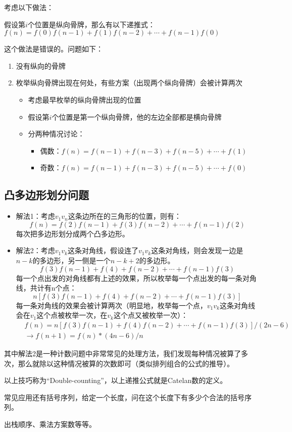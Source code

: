 \documentclass{article}
\begin{document}
考虑以下做法：

假设第$i$个位置是纵向骨牌，那么有以下递推式：
$f(n)=f(0)f(n-1)+f(1)f(n-2)+\cdots+f(n-1)f(0)$

这个做法是错误的。问题如下：
\begin{enumerate}
  \item{没有纵向的骨牌}
  \item{枚举纵向骨牌出现在何处，有些方案（出现两个纵向骨牌）会被计算两次}
  \begin{itemize}
    \item{考虑最早枚举的纵向骨牌出现的位置}
    \item{假设第$i$个位置是第一个纵向骨牌，他的左边全部都是横向骨牌}
    \item{分两种情况讨论：}
    \begin{itemize}
      \item{偶数：$f(n)=f(n-1)+f(n-3)+f(n-5)+\cdots+f(1)$}
      \item{奇数：$f(n)=f(n-1)+f(n-3)+f(n-5)+\cdots+f(0)$}
    \end{itemize}
  \end{itemize}
\end{enumerate}
\subsection{凸多边形划分问题}
\begin{itemize}
    \item{解法1：考虑$v_1v_n$这条边所在的三角形的位置，则有：
    \begin{equation*}
      f(n)=f(2)f(n-1)+f(3)f(n-2)+\cdots+f(n-1)f(2)
    \end{equation*}
    每次把多边形划分成两个凸多边形。}
    \item{解法2：考虑$v_1v_k$这条对角线，假设连了$v_1v_k$这条对角线，则会发现一边是$n-k$的多边形，另一侧是一个$n-k+2$的多边形。
    \begin{equation*}
      f(3)f(n-1)+f(4)+f(n-2)+\cdots+f(n-1)f(3)
    \end{equation*}
    每一个点出发的对角线都有上述的效果，所以枚举每一个点出发的每一条对角线，共计有n个点：
    \begin{equation*}
      n[f(3)f(n-1)+f(4)+f(n-2)+\cdots+f(n-1)f(3)]
    \end{equation*}
    每一条对角线的效果会被计算两次（明显地，枚举每一个点，$v_1v_k$这条对角线会在$v_1$这个点被枚举一次，在$v_k$这个点又被枚举一次）：
    \begin{equation*}
      \begin{aligned}
    &f(n)=n[f(3)f(n-1)+f(4)f(n-2)+\cdots+f(n-1)f(3)]/(2n-6)\\
    &\to f(n+1)=f(n)*(4n-6)/n
      \end{aligned}
    \end{equation*}
    }
\end{itemize}
其中解法2是一种计数问题中非常常见的处理方法，我们发现每种情况被算了多次，那么就除以这种情况被算的次数即可（类似排列组合的公式的推导）。

以上技巧称为``Double-counting''，以上递推公式就是Catelan数的定义。

常见应用还有括号序列，给定一个长度，问在这个长度下有多少个合法的括号序列。

出栈顺序、乘法方案数等等。
\end{document}
